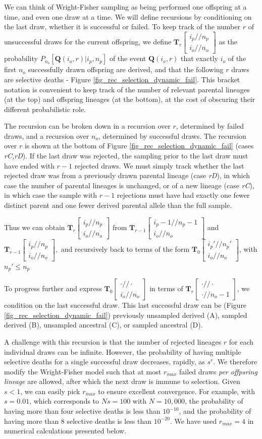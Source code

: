 \documentclass[review]{elsarticle}
\newcommand{\dslash}{/\!\!/}
\newcommand{\Coalc}[4]{\begin{bmatrix}#1\dslash #2 \\ #3\dslash #4 \end{bmatrix}}
\begin{document}
We can think of Wright-Fisher sampling as being performed one offspring at a time,
and even one draw at a time. We will define recursions by conditioning on the last draw, 
whether it is successful or failed. 
To keep track of the number $r$ of unsuccessful draws for the current offspring, we define $\mathbf{T}_{r}\Coalc{i_p}{n_p}{i_o}{n_o}$ as the probability
$P_{n_o}\left[\mathbf{Q}(i_o,r) | i_p, n_p\right]$ of the event $\mathbf{Q}(i_o,r)$ that exactly $i_o$ of the
first $n_o$ successfully drawn offspring are derived, and that the following $r$ draws are selective
deaths - Figure \ref{fig_rec_selection_dynamic_fail}. This bracket notation is convenient to keep track of
the number of relevant parental lineages (at the top) and offspring lineages (at the bottom), at the
cost of obscuring their different probabilistic role.

The recursion can be broken down in a recursion over $r$, determined by failed draws, 
and a recursion over $n_o$, determined by successful draws.  
The recursion over $r$ is shown at the bottom of
Figure \ref{fig_rec_selection_dynamic_fail} (cases \textit{rC,rD}). If the last draw was rejected, the sampling 
prior to the last draw must have ended with $r-1$ rejected draws. We
must simply track whether the last rejected draw was from a previously drawn parental lineage (case
\textit{rD}), in which case the number of parental lineages is unchanged, or of a new lineage (case
\textit{rC}), in which case the sample with $r-1$ rejections must have had exactly one fewer distinct parent and 
one fewer derived parental allele than the full sample.  
 
Thus we can obtain $\mathbf{T}_{r}\Coalc{i_p}{n_p}{i_o}{n_o}$ from
$\mathbf{T}_{r-1}\Coalc{i_p-1}{n_p-1}{i_o}{n_o}$ and $\mathbf{T}_{r-1}\Coalc{i_p}{n_p}{i_o}{n_o},$
and recursively back to terms of the form $\mathbf{T}_{0}\Coalc{i_p'}{n_p'}{i_o}{n_o}$, with $n_p'\leq n_p$
  
To progress further and express $\mathbf{T}_{0}\Coalc{\cdot}{\cdot}{i_o}{n_o}$ in terms of
$\mathbf{T}_{r}\Coalc{\cdot}{\cdot}{\cdot}{n_o-1}$, we condition on the last successful draw. This
last successful draw can be (Figure \ref{fig_rec_selection_dynamic_fail}) previously unsampled
derived (A), sampled derived (B), unsampled ancestral (C), or sampled ancestral (D).
  
A challenge with this recursion is that the number of rejected lineages $r$ for each individual draws 
can be infinite.
 However, the probability of having multiple selective deaths for a single successful draw decreases,
rapidly, as $s^r.$ We therefore modify the Wright-Fisher model such that at most $r_{max}$ failed
draws \emph{per offpsring lineage} are allowed, after which the next draw is immune to selection. Given
$s<1$, we can easily pick $r_{max}$ to ensure excellent convergence. For example, with $s=0.01$, 
which corresponds to $Ns=100$ with $N=10,000$, the probability of having more than 
four selective deaths is less than $10^{-10}$, and the probability of having more than 8 selective deaths is 
less than $10^{-20}.$ We have used $r_{max}=4$ in numerical calculations presented below. 
\end{document}
